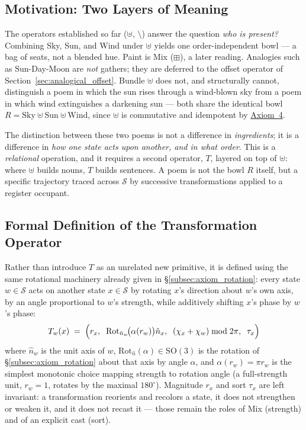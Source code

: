 \documentclass[12pt, a4paper]{article}
\begin{document}
\subsection{Motivation: Two Layers of Meaning}
\label{subsec:transform_motivation}
The operators established so far ($\uplus$, $\setminus$) answer the question
\emph{who is present?} Combining Sky, Sun, and Wind under $\uplus$
yields one order-independent bowl --- a bag of seats, not a blended
hue. Paint is Mix ($\boxplus$), a later reading. Analogies such as Sun-Day-Moon are \emph{not} gathers; they are deferred to the offset operator of Section~\ref{sec:analogical_offset}. Bundle $\uplus$ does not, and structurally
cannot, distinguish a poem in which the sun rises through a wind-blown
sky from a poem in which wind extinguishes a darkening sun --- both
share the identical bowl
$R = \text{Sky} \uplus \text{Sun} \uplus \text{Wind}$, since $\uplus$
is commutative and idempotent by \hyperref[subsec:axiom_idempotence]{Axiom~4}.

The distinction between these two poems is not a difference in
\emph{ingredients}; it is a difference in \emph{how one state acts
upon another, and in what order}. This is a \emph{relational}
operation, and it requires a second operator, $T$, layered on top of
$\uplus$: where $\uplus$ builds nouns, $T$ builds sentences. A poem is
not the bowl $R$ itself, but a specific trajectory traced across
$\mathcal{S}$ by successive transformations applied to a register occupant.

\subsection{Formal Definition of the Transformation Operator}
\label{subsec:transform_definition}
Rather than introduce $T$ as an unrelated new primitive, it is defined
using the same rotational machinery already given in
\S\ref{subsec:axiom_rotation}: every state $w \in \mathcal{S}$
acts on another state $x \in \mathcal{S}$ by rotating $x$'s direction
about $w$'s own axis, by an angle proportional to $w$'s strength, while
additively shifting $x$'s phase by $w$'s phase:
\begin{equation}
    T_w(x)
    \;=\;
    \Bigl(
        r_x,\;\;
        \mathrm{Rot}_{\hat n_w}\!\bigl(\alpha(r_w)\bigr)\hat n_x,\;\;
        (\chi_x + \chi_w) \bmod 2\pi,\;\;
        \tau_x
    \Bigr)
    \label{eq:transform_def}
\end{equation}
where $\hat n_w$ is the unit axis of $w$,
$\mathrm{Rot}_{\hat n}(\alpha) \in \mathrm{SO}(3)$ is the
rotation of \S\ref{subsec:axiom_rotation} about that axis by angle
$\alpha$, and $\alpha(r_w) = \pi r_w$ is the simplest monotonic choice
mapping strength to rotation angle (a full-strength unit, $r_w = 1$,
rotates by the maximal $180^\circ$). Magnitude $r_x$ and sort $\tau_x$ are left invariant:
a transformation reorients and recolors a state, it does not
strengthen or weaken it, and it does not recast it --- those remain
the roles of Mix (strength) and of an explicit cast (sort).
\end{document}
